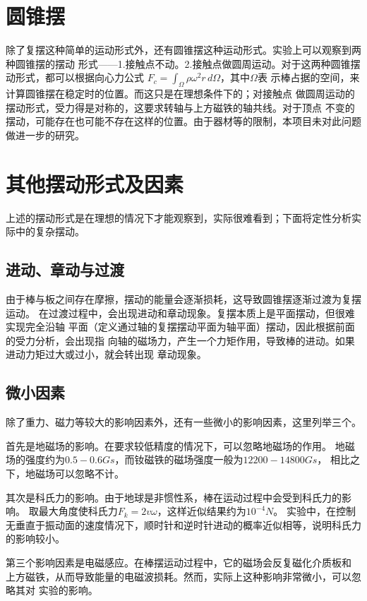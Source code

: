 \documentclass[AutoFakeBold]{LZUThesis}
\begin{document}
\section{圆锥摆}

除了复摆这种简单的运动形式外，还有圆锥摆这种运动形式。实验上可以观察到两种圆锥摆的摆动
形式——1.接触点不动。2.接触点做圆周运动。对于这两种圆锥摆动形式，都可以根据向心力公式
$F_c = \int_{\Omega} \rho\omega^2r \,d\Omega$，其中$\Omega$表
示棒占据的空间，来计算圆锥摆在稳定时的位置。而这只是在理想条件下的；对接触点
做圆周运动的摆动形式，受力得是对称的，这要求转轴与上方磁铁的轴共线。对于顶点
不变的摆动，可能存在也可能不存在这样的位置。由于器材等的限制，本项目未对此问题做进一步的研究。

\section{其他摆动形式及因素}
上述的摆动形式是在理想的情况下才能观察到，实际很难看到；下面将定性分析实际中的复杂摆动。

\subsection{进动、章动与过渡}
由于棒与板之间存在摩擦，摆动的能量会逐渐损耗，这导致圆锥摆逐渐过渡为复摆运动。
在过渡过程中，会出现进动和章动现象。复摆本质上是平面摆动，但很难实现完全沿轴
平面（定义通过轴的复摆摆动平面为轴平面）摆动，因此根据前面的受力分析，会出现指
向轴的磁场力，产生一个力矩作用，导致棒的进动。如果进动力矩过大或过小，就会转出现
章动现象。

\subsection{微小因素}
除了重力、磁力等较大的影响因素外，还有一些微小的影响因素，这里列举三个。

首先是地磁场的影响。在要求较低精度的情况下，可以忽略地磁场的作用。
地磁场的强度约为$0.5-0.6Gs$，而钕磁铁的磁场强度一般为$12200-14800Gs$，
相比之下，地磁场可以忽略不计。

其次是科氏力的影响。由于地球是非惯性系，棒在运动过程中会受到科氏力的影响。
取最大角度使科氏力$F_k = 2v\omega$，这样近似结果约为$10^{-4}N$。
实验中，在控制无垂直于振动面的速度情况下，顺时针和逆时针进动的概率近似相等，说明科氏力的影响较小。


第三个影响因素是电磁感应。在棒摆运动过程中，它的磁场会反复磁化介质板和
上方磁铁，从而导致能量的电磁波损耗。然而，实际上这种影响非常微小，可以忽略其对
实验的影响。
\end{document}
